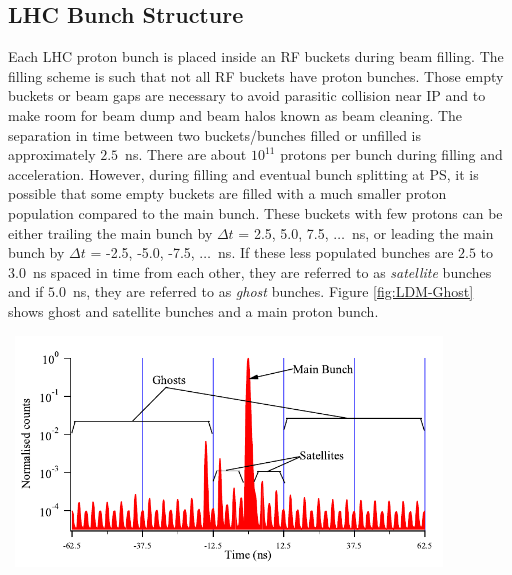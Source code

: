 \subsection{LHC Bunch Structure}\label{Ghost}
Each LHC proton bunch is placed inside an RF buckets during beam filling. %
The filling scheme is such that not all RF buckets have proton bunches. 
Those empty buckets or beam gaps are necessary to avoid parasitic collision near IP and to make room for beam dump and beam halos known as beam cleaning.%
The separation in time between two buckets/bunches filled or unfilled is approximately $2.5$~ns. There are  about $10^{11}$ protons per bunch during filling and acceleration.
However, during filling and eventual bunch splitting at PS, it is possible that some empty buckets are filled with a much smaller proton population compared to the main bunch. These buckets with few protons can be either trailing the main bunch by $\Delta t$ = 2.5, 5.0, 7.5, $\ldots$~ns, or leading the main bunch by $\Delta t$ = -2.5, -5.0, -7.5, $\ldots$~ns. If these less populated bunches are $2.5$ to $3.0$~ns spaced in time from each other, they are referred to as \textit{satellite} bunches and if $5.0$~ns, they are referred to as \textit{ghost} bunches. Figure \ref{fig:LDM-Ghost} shows ghost and satellite bunches and a main proton bunch.
\begin{center}
\centering
\mbox{
\includegraphics[height=0.5\textwidth, width=0.85\textwidth]{THESISPLOTS/Ghost-Satellite-Bunches-LDM.png}} 
\label{fig:LDM-Ghost}
\end{center}
